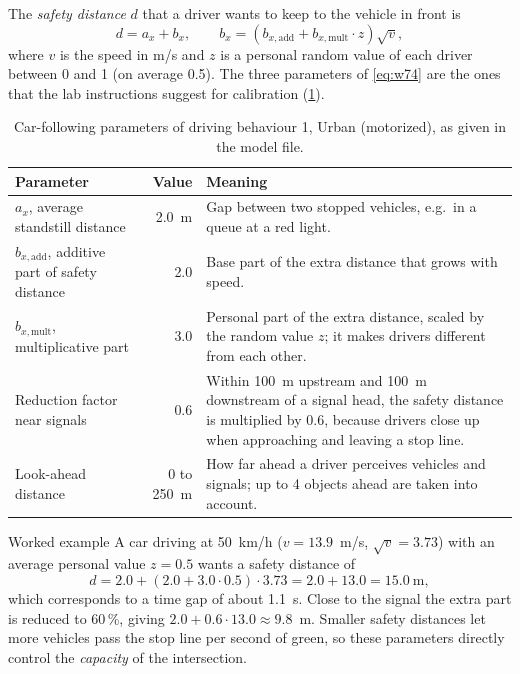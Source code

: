 \documentclass[11pt,a4paper]{article}
\newcommand{\kmh}{~km/h}
\begin{document}
The \emph{safety distance} $d$ that a driver wants to keep to the vehicle in front is
\begin{equation}
d = a_x + b_x, \qquad b_x = \left(b_{x,\mathrm{add}} + b_{x,\mathrm{mult}}\cdot z\right)\sqrt{v},
\label{eq:w74}
\end{equation}
where $v$ is the speed in m/s and $z$ is a personal random value of each driver between 0 and 1
(on average 0.5). The three parameters of \cref{eq:w74} are the ones that the lab instructions
suggest for calibration (\cref{tab:w74}).

\begin{table}[!htb]
\centering
\caption[Car-following parameters]{Car-following parameters of driving behaviour 1, Urban
(motorized), as given in the model file.}
\label{tab:w74}
\small
\begin{tabularx}{\textwidth}{lrX}
\toprule
\textbf{Parameter} & \textbf{Value} & \textbf{Meaning}\\
\midrule
$a_x$, average standstill distance & 2.0~m & Gap between two stopped vehicles, e.g.\ in a queue at
a red light.\\
$b_{x,\mathrm{add}}$, additive part of safety distance & 2.0 & Base part of the extra distance
that grows with speed.\\
$b_{x,\mathrm{mult}}$, multiplicative part & 3.0 & Personal part of the extra distance, scaled by
the random value $z$; it makes drivers different from each other.\\
Reduction factor near signals & 0.6 & Within 100~m upstream and 100~m downstream of a signal
head, the safety distance is multiplied by 0.6, because drivers close up when approaching and
leaving a stop line.\\
Look-ahead distance & 0 to 250~m & How far ahead a driver perceives vehicles and signals; up to 4
objects ahead are taken into account.\\
\bottomrule
\end{tabularx}
\end{table}

\begin{plainbox}{Worked example}
A car driving at 50\kmh{} ($v = 13.9$~m/s, $\sqrt{v} = 3.73$) with an average personal value
$z = 0.5$ wants a safety distance of
\[
d = 2.0 + (2.0 + 3.0 \cdot 0.5)\cdot 3.73 = 2.0 + 13.0 = 15.0~\text{m},
\]
which corresponds to a time gap of about 1.1~s. Close to the signal the extra part is reduced to
60\,\%, giving $2.0 + 0.6 \cdot 13.0 \approx 9.8$~m. Smaller safety distances let more vehicles pass
the stop line per second of green, so these parameters directly control the \emph{capacity} of the
intersection.
\end{plainbox}
\end{document}
